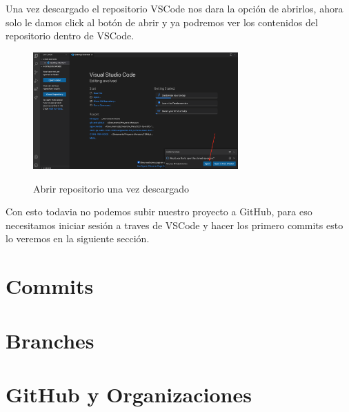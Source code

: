 \documentclass[11pt, oneside]{article}
\begin{document}
Una vez descargado el repositorio VSCode nos dara la opción de abrirlos, ahora solo le damos click al botón de abrir y ya podremos ver los contenidos del repositorio dentro de VSCode.

\begin{figure}[H]
  \centering
  \caption{Abrir repositorio una vez descargado}
  \includegraphics[width=0.70\textwidth]{./img/github-new-repo-12.png}
  \label{fig:github-new-repo-12}
\end{figure}

Con esto todavia no podemos subir nuestro proyecto a GitHub, para eso necesitamos iniciar sesión a traves de VSCode y hacer los primero commits esto lo veremos en la siguiente sección.

\section{Commits}

\section{Branches}

\section{GitHub y Organizaciones}
\end{document}
